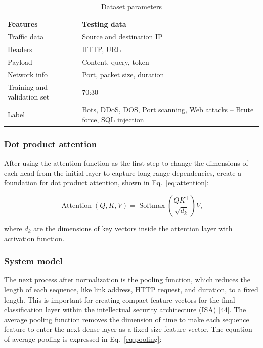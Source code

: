 \begin{table}[htbp]
  \centering
  \small
  \caption{Dataset parameters}
  \label{tab:dataset}
  \begin{tabularx}{\linewidth}{@{}lX@{}}
    \toprule
    Features & Testing data \\
    \midrule
    Traffic data & Source and destination IP \\
    Headers & HTTP, URL \\
    Payload & Content, query, token \\
    Network info & Port, packet size, duration \\
    Training and validation set & 70:30 \\
    Label & Bots, DDoS, DOS, Port scanning, Web attacks -- Brute force, SQL injection \\
    \bottomrule
  \end{tabularx}
\end{table}

\subsubsection{Dot product attention}\label{sec:attention}

After using the attention function as the first step to change the dimensions of each head from the
initial layer to capture long-range dependencies, create a foundation for dot product attention,
shown in Eq.~\eqref{eq:attention}:

\begin{equation}
  \operatorname{Attention}(Q,K,V)
  = \operatorname{Softmax}\left(\frac{QK^{\top}}{\sqrt{d_k}}\right)V,
  \label{eq:attention}
\end{equation}

where \(d_k\) are the dimensions of key vectors inside the attention layer with activation
function.

\subsubsection{System model}\label{sec:system}

The next process after normalization is the pooling function, which reduces the length of each
sequence, like link address, HTTP request, and duration, to a fixed length. This is important for
creating compact feature vectors for the final classification layer within the intellectual
security architecture (ISA) [44]. The average pooling function removes the dimension of time to
make each sequence feature to enter the next dense layer as a fixed-size feature vector. The
equation of average pooling is expressed in Eq.~\eqref{eq:pooling}:

